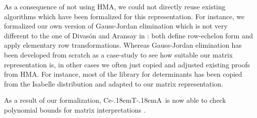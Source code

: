 \documentclass[11pt,a4paper]{article}
\newcommand\ceta{\textsf{Ce\kern-.18emT\kern-.18emA}}
\begin{document}
As a consequence of not using HMA, we could not directly reuse existing 
algorithms which
have been formalized for this representation. For instance, we formalized our
own version of Gauss-Jordan elimination which is not very different to the
one of Divas\'on and Aransay in \cite{Gauss_Jordan-AFP}: both define row-echelon
form and apply elementary row transformations. Whereas Gauss-Jordan elimination
has been developed from scratch as a case-study to see how suitable our matrix
representation is, in other cases we often just
copied and adjusted existing proofs from HMA. For instance, most of the library for 
determinants has been copied from the Isabelle distribution and adapted to our
matrix representation.


As a result of our formalization, \ceta\ is now able to check  
polynomial bounds for matrix interpretations \cite{MatrixJAR}. 








\end{document}
